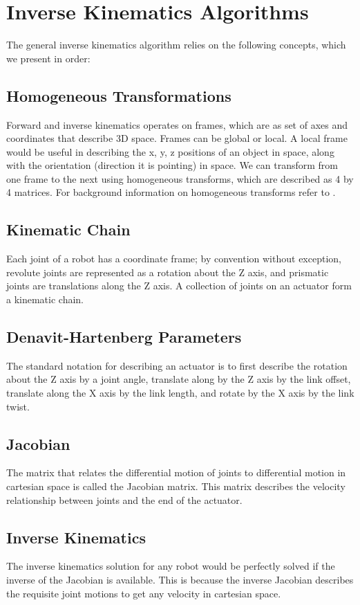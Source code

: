 \section{Inverse Kinematics Algorithms}
The general inverse kinematics algorithm relies on the following concepts, which we present in order:

\subsection{Homogeneous Transformations}
Forward and inverse kinematics operates on frames, which are as set of axes and coordinates that describe 3D space. Frames can be global or local. A local frame would be useful in describing the x, y, z positions of an object in space, along with the orientation (direction it is pointing) in space. We can transform from one frame to the next using homogeneous transforms, which are described as 4 by 4 matrices. For background information on homogeneous transforms refer to \cite{frames}.

\subsection{Kinematic Chain}
Each joint of a robot has a coordinate frame; by convention without exception, revolute joints are represented as a rotation about the Z axis, and prismatic joints are translations along the Z axis. A collection of joints on an actuator form a kinematic chain.

\subsection{Denavit-Hartenberg Parameters}
The standard notation for describing an actuator is to first describe the rotation about the Z axis by a joint angle, translate along by the Z axis by the link offset, translate along the X axis by the link length, and rotate by the X axis by the link twist.

\subsection{Jacobian}
The matrix that relates the differential motion of joints to differential motion in cartesian space is called the Jacobian matrix. This matrix describes the velocity relationship between joints and the end of the actuator.\cite{jacobian}

\subsection{Inverse Kinematics}
The inverse kinematics solution for any robot would be perfectly solved if the inverse of the Jacobian is available. This is because the inverse Jacobian describes the requisite joint motions to get any velocity in cartesian space.\cite{jacobian}

